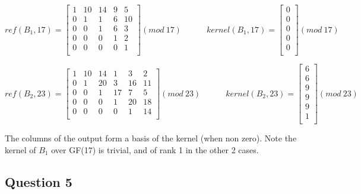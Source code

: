 \documentclass[10pt,a4paper]{report}
\begin{document}
\vspace{5mm}

\begin{equation*}
ref(B_1,17)=\begin{bmatrix}
1 & 10 & 14 & 9 & 5 \\
0 & 1 & 1 & 6 & 10\\
0 & 0 & 1 & 6 & 3\\
0 & 0 & 0 & 1 & 2\\
0 & 0 & 0 & 0 & 1\\
\end{bmatrix} (mod \: 17)
\quad \quad \quad
kernel(B_1,17)=\begin{bmatrix}
0\\
0\\
0\\
0\\
0\\
\end{bmatrix} (mod \: 17)
\end{equation*}

\vspace{5mm}

\begin{equation*}
ref(B_2,23)=\begin{bmatrix}
1 & 10 & 14 & 1 & 3 & 2 \\
0 & 1 & 20 & 3 & 16 & 11\\
0 & 0 & 1 & 17 & 7 & 5\\
0 & 0 & 0 & 1 & 20 & 18\\
0 & 0 & 0 & 0 & 1 & 14\\
\end{bmatrix} (mod \: 23)
\quad \quad \quad
kernel(B_2,23)=\begin{bmatrix}
6\\
6\\
9\\
9\\
9\\
1\\
\end{bmatrix} (mod \: 23)
\end{equation*}

\vspace{5mm}

The columns of the output form a basis of the kernel (when non zero). Note the kernel of $B_1$ over GF(17) is trivial, and of rank 1 in the other 2 cases.

\subsection*{Question 5}
\end{document}
